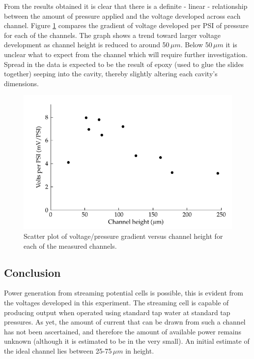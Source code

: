 From the results obtained it is clear that there is a definite \nobreakdash-
linear \nobreakdash- relationship between the amount of pressure applied and
the voltage developed across each channel. Figure
\ref{fig:streamingCell_scatter_voltGradVsHeight} compares the gradient of
voltage developed per PSI of pressure for each of the channels. The graph shows
a trend toward larger voltage development as channel height is reduced to
around 50$\,\mu m$. Below 50$\,\mu m$ it is unclear what to expect from the
channel which will require further investigation. Spread in the data is
expected to be the result of epoxy (used to glue the slides together) seeping
into the cavity, thereby slightly altering each cavity's dimensions.

\begin{figure} \begin{centering}
        \includegraphics{content/pt1/01-PowerHarvesting/graphics/streamingCell_slopeVsChannelHeight}
        \par\end{centering}

\protect\caption{\label{fig:streamingCell_scatter_voltGradVsHeight}Scatter plot
    of voltage/pressure gradient versus channel height for each of the measured
    channels.}


\end{figure}



\subsection{Conclusion}

Power generation from streaming potential cells is possible, this is evident
from the voltages developed in this experiment. The streaming cell is capable
of producing output when operated using standard tap water at standard tap
pressures. As yet, the amount of current that can be drawn from such a channel
has not been ascertained, and therefore the amount of available power remains
unknown (although it is estimated to be in the very small). An initial estimate
of the ideal channel lies between 25-75$\,\mu m$ in height.


